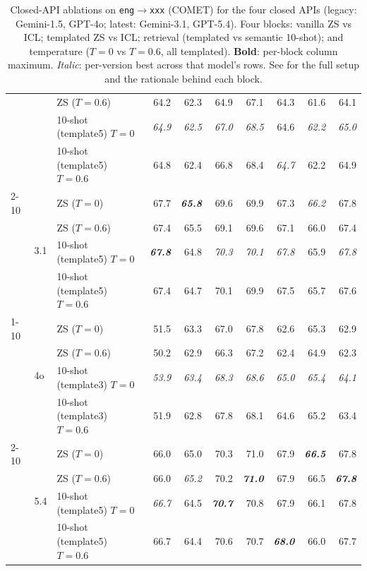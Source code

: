 \begin{table}[t]
\begin{tabular}{lllrrrrrrr}
 &  & ZS ($T{=}0.6$) & 64.2 & 62.3 & 64.9 & 67.1 & 64.3 & 61.6 & 64.1 \\
 &  & 10-shot (template5) $T{=}0$ & \emph{64.9} & \emph{62.5} & \emph{67.0} & \emph{68.5} & 64.6 & \emph{62.2} & \emph{65.0} \\
 &  & 10-shot (template5) $T{=}0.6$ & 64.8 & 62.4 & 66.8 & 68.4 & \emph{64.7} & 62.2 & 64.9 \\
\cmidrule(lr){2-10}
 & \multirow{4}{*}{3.1} & ZS ($T{=}0$) & 67.7 & \textbf{\emph{65.8}} & 69.6 & 69.9 & 67.3 & \emph{66.2} & 67.8 \\
 &  & ZS ($T{=}0.6$) & 67.4 & 65.5 & 69.1 & 69.6 & 67.1 & 66.0 & 67.4 \\
 &  & 10-shot (template5) $T{=}0$ & \textbf{\emph{67.8}} & 64.8 & \emph{70.3} & \emph{70.1} & \emph{67.8} & 65.9 & \emph{67.8} \\
 &  & 10-shot (template5) $T{=}0.6$ & 67.4 & 64.7 & 70.1 & 69.9 & 67.5 & 65.7 & 67.6 \\
\cmidrule(lr){1-10}
\multirow{8}{*}{GPT} & \multirow{4}{*}{4o} & ZS ($T{=}0$) & 51.5 & 63.3 & 67.0 & 67.8 & 62.6 & 65.3 & 62.9 \\
 &  & ZS ($T{=}0.6$) & 50.2 & 62.9 & 66.3 & 67.2 & 62.4 & 64.9 & 62.3 \\
 &  & 10-shot (template3) $T{=}0$ & \emph{53.9} & \emph{63.4} & \emph{68.3} & \emph{68.6} & \emph{65.0} & \emph{65.4} & \emph{64.1} \\
 &  & 10-shot (template3) $T{=}0.6$ & 51.9 & 62.8 & 67.8 & 68.1 & 64.6 & 65.2 & 63.4 \\
\cmidrule(lr){2-10}
 & \multirow{4}{*}{5.4} & ZS ($T{=}0$) & 66.0 & 65.0 & 70.3 & 71.0 & 67.9 & \textbf{\emph{66.5}} & 67.8 \\
 &  & ZS ($T{=}0.6$) & 66.0 & \emph{65.2} & 70.2 & \textbf{\emph{71.0}} & 67.9 & 66.5 & \textbf{\emph{67.8}} \\
 &  & 10-shot (template5) $T{=}0$ & \emph{66.7} & 64.5 & \textbf{\emph{70.7}} & 70.8 & 67.9 & 66.1 & 67.8 \\
 &  & 10-shot (template5) $T{=}0.6$ & 66.7 & 64.4 & 70.6 & 70.7 & \textbf{\emph{68.0}} & 66.0 & 67.7 \\
\bottomrule
\end{tabular}
\caption{Closed-API ablations on \texttt{eng}$\to$\texttt{xxx} (COMET) for the four closed APIs (legacy: Gemini-1.5, GPT-4o; latest: Gemini-3.1, GPT-5.4). Four blocks: vanilla ZS vs ICL; templated ZS vs ICL; retrieval (templated vs semantic 10-shot); and temperature ($T{=}0$ vs $T{=}0.6$, all templated). \textbf{Bold}: per-block column maximum. \emph{Italic}: per-version best across that model's rows. See  for the full setup and the rationale behind each block.}
\label{tab:closed_ablations_comet}
\end{table}
